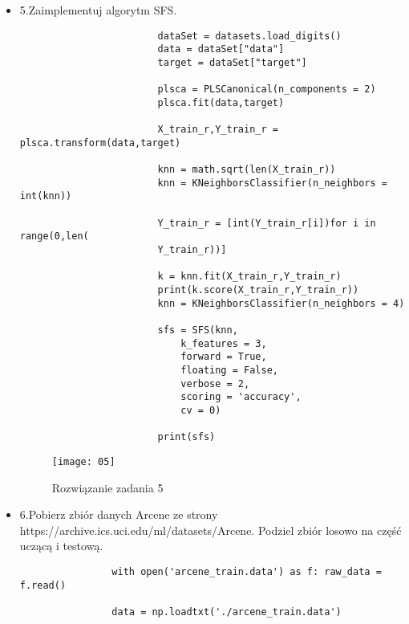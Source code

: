 \documentclass[12pt,a4paper]{article}
\begin{document}
\begin{itemize}
        \item 5.Zaimplementuj algorytm SFS.
        	\begin{lstlisting}
                        dataSet = datasets.load_digits()
                        data = dataSet["data"]
                        target = dataSet["target"]
                         
                        plsca = PLSCanonical(n_components = 2)
                        plsca.fit(data,target)
                         
                        X_train_r,Y_train_r = plsca.transform(data,target)
                         
                        knn = math.sqrt(len(X_train_r))
                        knn = KNeighborsClassifier(n_neighbors = int(knn))
                         
                        Y_train_r = [int(Y_train_r[i])for i in range(0,len(
                        Y_train_r))]
                         
                        k = knn.fit(X_train_r,Y_train_r)
                        print(k.score(X_train_r,Y_train_r))
                        knn = KNeighborsClassifier(n_neighbors = 4)
                         
                        sfs = SFS(knn,
                            k_features = 3,
                            forward = True,
                            floating = False,
                            verbose = 2,
                            scoring = 'accuracy',
                            cv = 0)
                        
                        print(sfs)

	\end{lstlisting}
		\begin{figure}[h]
                        \texttt{[image: 05]}
                        \centering
			\caption{Rozwiązanie zadania 5}
			\label{fig:fig5}
                \end{figure}
                \clearpage

        \item 6.Pobierz zbiór danych Arcene ze strony https://archive.ics.uci.edu/ml/datasets/Arcene. Podziel zbiór losowo na część uczącą i testową.
        \begin{lstlisting}
                with open('arcene_train.data') as f: raw_data = f.read()
 
                data = np.loadtxt('./arcene_train.data')
                 

\end{lstlisting}
\end{itemize}
\end{document}
